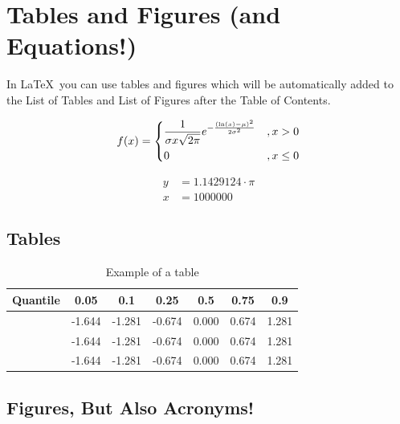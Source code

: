 \documentclass[masterthesis, english]{mas-thesis-chapters} %
\begin{document}
\section{Tables and Figures (and Equations!)}

In \LaTeX\ you can use tables and figures which will be automatically added to the List of Tables and List of Figures after the Table of Contents.

\begin{equation*}
        f(x) = 
        \begin{dcases}
            \frac{1}{\sigma x \sqrt{2 \pi}} e^{ - \frac{(\ln(x) - \mu)^2}{2 \sigma^2}} & , x > 0 \\
            0 & , x \leq 0
        \end{dcases}
\end{equation*}

\begin{align}
	y &= 1.1429124 \cdot \pi \\
	x &= 1000000
\end{align}

\subsection{Tables}

\begin{table}[ht]
\begin{center}
        \begin{tabu}{
            X
            S[table-format=-1.3]
            S[table-format=-1.3]
            S[table-format=-1.3]
            S[table-format=-1.3]
            S[table-format=-1.3]
            S[table-format=-1.3]}
            \toprule
            {Quantile} & 0.05 & 0.1 & 0.25 & 0.5 & 0.75 & 0.9 \\ 
            \midrule
             & -1.644 & -1.281 & -0.674 & 0.000 & 0.674 & 1.281 \\ 
             & -1.644 & -1.281 & -0.674 & 0.000 & 0.674 & 1.281 \\ 
             & -1.644 & -1.281 & -0.674 & 0.000 & 0.674 & 1.281 \\ 
             \bottomrule
        \end{tabu}
	\caption{Example of a table}
	\label{table:1}
\end{center}
\end{table}

\subsection{Figures, But Also Acronyms!}
\end{document}
